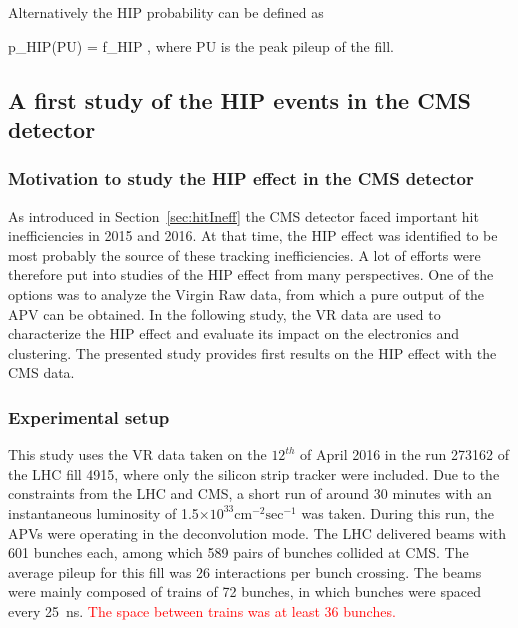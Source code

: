 Alternatively the HIP probability can be defined as

{
p_{HIP}(PU) = f_{HIP} ,
}
where PU is the peak pileup of the fill. 



\subsection{A first study of the HIP events in the CMS detector~\label{sec:firstStudy}}

\subsubsection{Motivation to study the HIP effect in the CMS detector}

As introduced in Section~\ref{sec:hitIneff} the CMS detector faced important hit inefficiencies in 2015 and 2016. At that time, the HIP effect was identified to be most probably the source of these tracking inefficiencies. A lot of efforts were therefore put into studies of the HIP effect from many perspectives. One of the options was to analyze the Virgin Raw data, from which a pure output of the APV can be obtained. In the following study, the VR data are used to characterize the HIP effect and evaluate its impact on the electronics and clustering. The presented study provides first results on the HIP effect with the CMS data.

\subsubsection{Experimental setup} 

This study uses the VR data taken on the $12^{th}$ of April 2016 in the run 273162 of the LHC fill 4915, where only the silicon strip tracker were included. Due to the constraints from the LHC and CMS, a short run of around 30 minutes with an instantaneous luminosity of 1.5$\times 10^{33} \mathrm{cm^{-2} sec^{-1}}$ was taken. During this run, the APVs were operating in the deconvolution mode. The LHC delivered beams with 601 bunches each, among which 589 pairs of bunches collided at CMS. The average pileup for this fill was 26 interactions per bunch crossing. The beams were mainly composed of trains of 72 bunches, in which bunches were spaced every 25~ns. \textcolor{red}{The space between trains was at least 36 bunches.}

